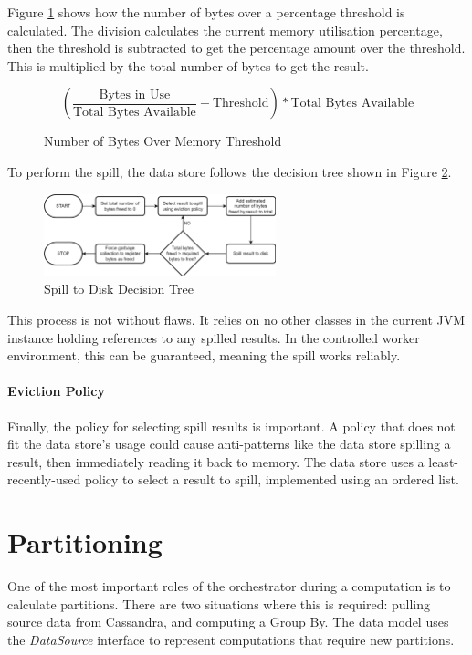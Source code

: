 Figure \ref{fig:bytes-over-memory-threshold} shows how the number of bytes over a percentage threshold is calculated. The division calculates the current memory utilisation percentage, then the threshold is subtracted to get the percentage amount over the threshold. This is multiplied by the total number of bytes to get the result.

\begin{figure}[h]
	\centering
	\[ \left( \frac{\text{Bytes in Use}}{\text{Total Bytes Available}} - \text{Threshold} \right) * \text{Total Bytes Available} \]
	\caption{Number of Bytes Over Memory Threshold}
	\label{fig:bytes-over-memory-threshold}
\end{figure}

To perform the spill, the data store follows the decision tree shown in Figure \ref{fig:spill-to-disk-process}.

\begin{figure}[h]
	\centering
	\includegraphics[width=0.6\textwidth]{chapters/diagrams/implementation/spill-to-disk-process}
	\caption{Spill to Disk Decision Tree}
	\label{fig:spill-to-disk-process}
\end{figure}

This process is not without flaws. It relies on no other classes in the current JVM instance holding references to any spilled results. In the controlled worker environment, this can be guaranteed, meaning the spill works reliably. 

\paragraph{Eviction Policy}
Finally, the policy for selecting spill results is important. A policy that does not fit the data store's usage could cause anti-patterns like the data store spilling a result, then immediately reading it back to memory. The data store uses a least-recently-used policy to select a result to spill, implemented using an ordered list.



\section{Partitioning}
One of the most important roles of the orchestrator during a computation is to calculate partitions. There are two situations where this is required:  pulling source data from Cassandra, and computing a Group By. The data model uses the \textit{DataSource} interface to represent computations that require new partitions. 

